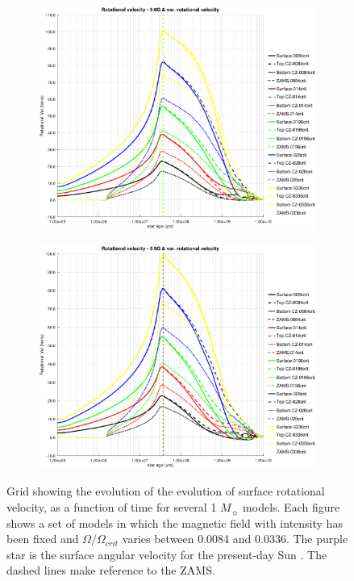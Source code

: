 \documentclass[fleqn,usenatbib]{mnras}
\begin{document}
\begin{figure}
\begin{subfigure}[h]{0.47\textwidth}
    \includegraphics[trim = 30mm 15mm 20mm 15mm, clip,width=\textwidth]{figures/rot_vel_var_vel_5_0g.eps}
    \label{fig:subim45}
    \end{subfigure}
    \begin{subfigure}[h]{0.47\textwidth}
    \includegraphics[trim = 30mm 15mm 20mm 15mm, clip,width=\textwidth]{figures/rot_vel_var_vel_5_5g.eps}
    \label{fig:subim46}
    \end{subfigure}
\caption{Grid showing the evolution of the evolution of surface rotational velocity, as a function of time for several 1 $M_{\sun}$ models. Each figure shows a set of models in which the magnetic field with intensity has been fixed and $\Omega / \Omega_{crit}$ varies between 0.0084 and 0.0336. The purple star is the surface angular velocity for the present-day Sun \citep{Gill2012}. The dashed lines make reference to the ZAMS.}
\label{fig:image24}
\end{figure}
\end{document}
